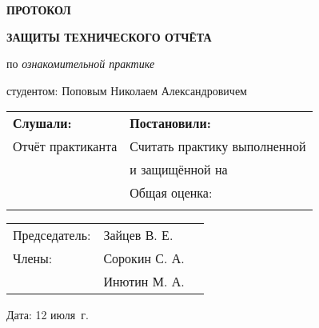 \begin{center}
\bfseries{\large ПРОТОКОЛ }

\vspace{12pt}

\bfseries{ЗАЩИТЫ ТЕХНИЧЕСКОГО ОТЧЁТА}
\end{center}
\noindent
по {\itshape ознакомительной практике}

\vspace{8pt}
\noindent
студентом:
\noindent
Поповым Николаем Александровичем

\begin{longtable}{p{7cm}|p{11cm}}
    \hline
    {\bfseries Слушали:} & {\bfseries Постановили:}  \\
    Отчёт практиканта & Считать практику выполненной \\
    & и защищённой на \\
    \rule{0pt}{450pt} & Общая оценка: \underline{\hspace{2in}}\\
    \rule{0pt}{15pt} & \\
    \hline
\end{longtable}

\vfill

\noindent\begin{tabular}{@{}l l l}
Председатель: & Зайцев В. Е. & \underline{\hspace{2in}} \\
Члены: & Сорокин С. А. & \underline{\hspace{2in}} \\
& Инютин М. А. & \underline{\hspace{2in}}
\end{tabular}
\vspace{12pt}

\noindent
Дата: 12 июля \the\year\,г.\hspace{50pt}

\pagebreak
